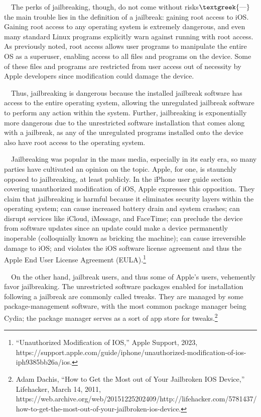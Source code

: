 \documentclass{article}
\begin{document}
\ \ The perks of jailbreaking, though, do not come without risks$\text{\textgreek{—}}$the main trouble lies in the
definition of a jailbreak: gaining root access to iOS. Gaining root access to any operating system is extremely
dangerous, and even many standard Linux programs explicitly warn against running with root access. As previously noted,
root access allows user programs to manipulate the entire OS as a superuser, enabling access to all files and programs
on the device. Some of these files and programs are restricted from user access out of necessity by Apple developers
since modification could damage the device.

\ \ Thus, jailbreaking is dangerous because the installed jailbreak software has access to the entire operating system,
allowing the unregulated jailbreak software to perform any action within the system. Further, jailbreaking is
exponentially more dangerous due to the unrestricted software installation that comes along with a jailbreak, as any of
the unregulated programs installed onto the device also have root access to the operating system.

\ \ Jailbreaking was popular in the mass media, especially in its early era, so many parties have cultivated an opinion
on the topic. Apple, for one, is staunchly opposed to jailbreaking, at least publicly. In the iPhone user guide section
covering unauthorized modification of iOS, Apple expresses this opposition. They claim that jailbreaking is harmful
because it eliminates security layers within the operating system; can cause increased battery drain and system
crashes; can disrupt services like iCloud, iMessage, and FaceTime; can preclude the device from software updates since
an update could make a device permanently inoperable (colloquially known as {\textquotedbl}bricking{\textquotedbl} the
machine); can cause irreversible damage to iOS; and violates the iOS software license agreement and thus the Apple End
User License Agreement (EULA).\footnote{“Unauthorized Modification of IOS,” Apple Support, 2023,
https://support.apple.com/guide/iphone/unauthorized-modification-of-ios-iph9385bb26a/ios.}

\ \ On the other hand, jailbreak users, and thus some of Apple's users, vehemently favor jailbreaking. The unrestricted
software packages enabled for installation following a jailbreak are commonly called
{\textquotedbl}tweaks.{\textquotedbl} They are managed by some package-management software, with the most common
package manager being Cydia; the package manager serves as a sort of {\textquotedbl}app store{\textquotedbl} for
tweaks.\footnote{Adam Dachis, “How to Get the Most out of Your Jailbroken IOS Device,” Lifehacker, March 14, 2011,
https://web.archive.org/web/20151225202409/http://lifehacker.com/5781437/how-to-get-the-most-out-of-your-jailbroken-ios-device.}
\end{document}
